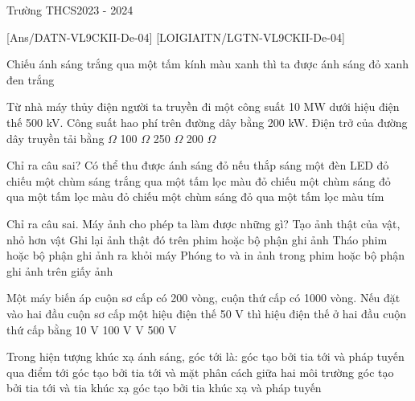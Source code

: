 \begin{name}{Trường THCS}{2023 - 2024}
\end{name}
[Ans/DATN-VL9CKII-De-04]
\hienthiloigiaiex
{}[LOIGIAITN/LGTN-VL9CKII-De-04]

\begin{ex}
	Chiếu ánh sáng trắng qua một tấm kính màu xanh thì ta được ánh sáng
	\choice
	{đỏ}
	{\True xanh}
	{đen}
	{trắng}
	\loigiai{}
\end{ex}

\begin{ex}
	Từ nhà máy thủy điện người ta truyền đi một công suất 10 MW dưới hiệu điện thế 500 kV. Công suất hao phí trên đường dây bằng 200 kW. Điện trở của đường dây truyền tải bằng
	\choice
	{ $\Omega$}
	{100 $\Omega$}
	{250 $\Omega$}
	{200 $\Omega$}
	\loigiai{}
\end{ex}
\begin{ex}
	Chỉ ra câu sai?
	Có thể thu được ánh sáng đỏ nếu
	\choice
	{thắp sáng một đèn LED đỏ}
	{chiếu một chùm sáng trắng qua một tấm lọc màu đỏ}
	{chiếu một chùm sáng đỏ qua một tấm lọc màu đỏ}
	{\True chiếu một chùm sáng đỏ qua một tấm lọc màu tím}
	\loigiai{}
\end{ex}

\begin{ex}
	Chỉ ra câu sai.
	Máy ảnh cho phép ta làm được những gì?
	\choice
	{Tạo ảnh thật của vật, nhỏ hơn vật}
	{Ghi lại ảnh thật đó trên phim hoặc bộ phận ghi ảnh}
	{Tháo phim hoặc bộ phận ghi ảnh ra khỏi máy}
	{\True Phóng to và in ảnh trong phim hoặc bộ phận ghi ảnh trên giấy ảnh}
	\loigiai{}
\end{ex}

\begin{ex}
	Một máy biến áp cuộn sơ cấp có 200 vòng, cuộn thứ cấp có 1000 vòng. Nếu đặt vào hai đầu cuộn sơ cấp một hiệu điện thế 50 V thì hiệu điện thế ở hai đầu cuộn thứ cấp bằng
	\choice
	{10 V}
	{100 V}
	{ V}
	{500 V}
	\loigiai{}
\end{ex}

\begin{ex}
	Trong hiện tượng khúc xạ ánh sáng, góc tới là:
	\choice
	{\True góc tạo bởi tia tới và pháp tuyến qua điểm tới}
	{góc tạo bởi tia tới và mặt phân cách giữa hai môi trường}
	{góc tạo bởi tia tới và tia khúc xạ}
	{góc tạo bởi tia khúc xạ và pháp tuyến}
	\loigiai{}
\end{ex}

